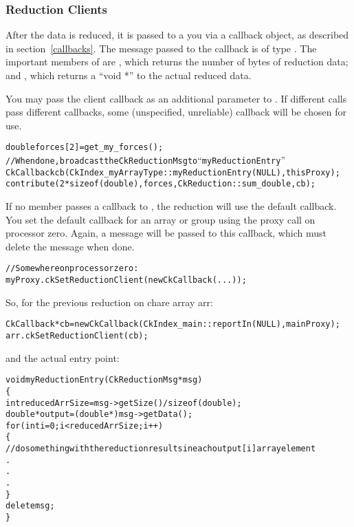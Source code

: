 \subsubsection{Reduction Clients}
\label{reductionClients}

After the data is reduced, it is passed to a you via a callback object,
as described in section~\ref{callbacks}.  The message passed to
the callback is of type .
The important members of  are
, which returns the number of bytes of reduction data; and
, which returns a ``void *'' to the actual reduced data.

You may pass the client callback as an additional parameter to .
If different  calls pass different callbacks, some (unspecified,
unreliable) callback will be chosen for use.
\begin{alltt}
    double forces[2]=get_my_forces();
    //When done, broadcast the CkReductionMsg to ``myReductionEntry''
    CkCallback cb(CkIndex_myArrayType::myReductionEntry(NULL), thisProxy);
    contribute(2*sizeof(double), forces,CkReduction::sum_double, cb);
\end{alltt}

If no member passes a callback to , the reduction will use
the default callback. You set the default callback for an array or group
using the  proxy call on processor zero.
Again, a  message will be passed to this callback,
which must delete the message when done.

\begin{alltt}
    //Somewhere on processor zero:
    myProxy.ckSetReductionClient(new CkCallback(...));
\end{alltt}

So, for the previous reduction on chare array arr:
\begin{alltt}
    CkCallback *cb = new CkCallback(CkIndex_main::reportIn(NULL),  mainProxy);
    arr.ckSetReductionClient(cb);
\end{alltt}

and the actual entry point:

\begin{alltt}
void myReductionEntry(CkReductionMsg *msg)
\{
  int reducedArrSize=msg->getSize() / sizeof(double);
  double *output=(double *) msg->getData();
  for(int i=0 ; i<reducedArrSize ; i++)
  \{
   // do something with the reduction results in each output[i] array element
   .
   .
   .
  \}
  delete msg;
\}
\end{alltt}


